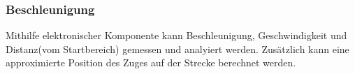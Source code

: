 \documentclass[../..main.tex]{subfiles}
\begin{document}
\subsubsection{Beschleunigung}
Mithilfe elektronischer Komponente kann Beschleunigung, Geschwindigkeit und Distanz(vom Startbereich) gemessen und analyiert werden. Zusätzlich kann eine approximierte Position des Zuges auf der Strecke berechnet werden.
\end{document}
